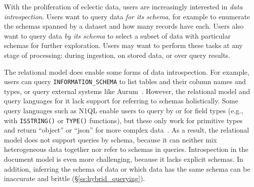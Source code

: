 With the proliferation of eclectic data, users are increasingly interested in {\em data introspection}. Users want to query data {\em for its schema}, for example to enumerate the schemas spanned by a dataset and how many records have each. Users also want to query data {\em by its schema} to select a subset of data with particular schemas for further exploration. 
Users may want to perform these tasks at any stage of processing: during ingestion, on stored data, or over query results.

The relational model does enable some forms of data introspection. For example, users can query \texttt{INFORMATION\_SCHEMA} to list tables and their column names and types, or query external systems like Aurum~\cite{aurum}.
However, the relational model and query languages for it lack support for referring to schemas holistically. Some query languages such as N1QL enable users to query by or for field types (e.g., with \texttt{ISSTRING()} or \texttt{TYPE()} functions), but these only work for primitive types and return ``object'' or ``json'' for more complex data~\cite{sqlite, n1ql, mongo}. As a result, the relational model does not support queries by schema, because it can neither mix heterogeneous data together nor refer to schemas in queries. Introspection in the document model is even more challenging, because it lacks explicit schemas. In addition, inferring the schema of data or which data has the same schema can be inaccurate and brittle (\S\ref{ss:hybrid_querying}).



